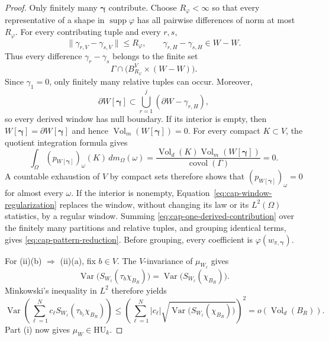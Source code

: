 \documentclass[11pt,reqno,a4paper]{amsart}
\numberwithin{equation}{section}
\theoremstyle{compact}
\theoremstyle{definition}
\theoremstyle{definition}
\newcommand{\HU}{\mathrm{HU}}
\newcommand{\Var}{\operatorname{Var}}
\newcommand{\Vol}{\operatorname{Vol}}
\begin{document}
\begin{proof}
Only finitely many $\boldsymbol\gamma$ contribute.  Choose $R_\varphi<\infty$
so that every representative of a shape in $\operatorname{supp}\varphi$ has
all pairwise differences of norm at most $R_\varphi$.  For every contributing
tuple and every $r,s$,
\[
  \|\gamma_{r,V}-\gamma_{s,V}\|\leq R_\varphi,
  \qquad
  \gamma_{r,H}-\gamma_{s,H}\in W-W.
\]
Thus every difference $\gamma_r-\gamma_s$ belongs to the finite set
\[
  \Gamma\cap\bigl(B_{R_\varphi}^V\times(W-W)\bigr).
\]
Since $\gamma_1=0$, only finitely many relative tuples can occur.  Moreover,
\begin{equation}\label{eq:cap-derived-window-boundary}
  \partial W[\boldsymbol\gamma]
  \subset \bigcup_{r=1}^j(\partial W-\gamma_{r,H}),
\end{equation}
so every derived window has null boundary.  If its interior is empty, then
$W[\boldsymbol\gamma]=\partial W[\boldsymbol\gamma]$ and hence
$\Vol_m(W[\boldsymbol\gamma])=0$.  For every compact $K\subset V$, the quotient
integration formula gives
\[
  \int_\Omega (p_{W[\boldsymbol\gamma]})_\omega(K)\,dm_\Omega(\omega)
  =\frac{\Vol_d(K)\Vol_m(W[\boldsymbol\gamma])}
         {\operatorname{covol}(\Gamma)}=0.
\]
A countable exhaustion of $V$ by compact sets therefore shows that
$(p_{W[\boldsymbol\gamma]})_\omega=0$ for almost every $\omega$.  If the
interior is nonempty, Equation~\eqref{eq:cap-window-regularization} replaces
the window, without changing its law or its $L^2(\Omega)$ statistics, by a
regular window.  Summing \eqref{eq:cap-one-derived-contribution} over the
finitely many partitions and relative tuples, and grouping identical terms,
gives \eqref{eq:cap-pattern-reduction}.  Before grouping, every coefficient is
$\varphi(w_{\pi,\boldsymbol\gamma})$.

For \textup{(ii)(b)} $\Rightarrow$ \textup{(ii)(a)}, fix $b\in V$.
The $V$-invariance of $\mu_{W_\ell}$ gives
\[
  \Var\bigl(S_{W_\ell}(\tau_b\chi_{B_R})\bigr)
  =\Var\bigl(S_{W_\ell}(\chi_{B_R})\bigr).
\]
Minkowski's inequality in $L^2$ therefore yields
\begin{equation}\label{eq:cap-finite-sum-variance}
  \Var\!\left(\sum_{\ell=1}^N c_\ell
      S_{W_\ell}(\tau_{b_\ell}\chi_{B_R})\right)
  \leq
  \left(\sum_{\ell=1}^N |c_\ell|
    \sqrt{\Var\bigl(S_{W_\ell}(\chi_{B_R})\bigr)}\right)^2
  =o(\Vol_d(B_R)).
\end{equation}
Part \textup{(i)} now gives $\mu_W\in\HU_k$.


\end{proof}
\end{document}
